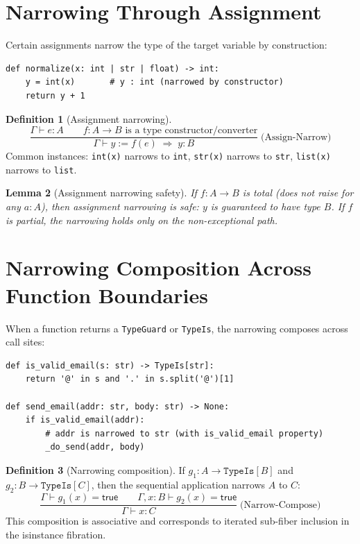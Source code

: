 \documentclass[11pt,a4paper]{report}
\theoremstyle{definition}
\newtheorem{definition}{Definition}[chapter]
\theoremstyle{plain}
\newtheorem{lemma}[definition]{Lemma}
\begin{document}
\section{Narrowing Through Assignment}

Certain assignments narrow the type of the target variable by construction:

\begin{lstlisting}[style=python]
def normalize(x: int | str | float) -> int:
    y = int(x)       # y : int (narrowed by constructor)
    return y + 1
\end{lstlisting}

\begin{definition}[Assignment narrowing]
\[
  \frac{
    \Gamma \vdash e : A \qquad
    f : A \to B \text{ is a type constructor/converter}
  }{
    \Gamma \vdash y \mathbin{:=} f(e) \;\Longrightarrow\; y : B
  }
  \;\text{(Assign-Narrow)}
\]
Common instances: \texttt{int(x)} narrows to \texttt{int},
\texttt{str(x)} narrows to \texttt{str}, \texttt{list(x)} narrows to
\texttt{list}.
\end{definition}

\begin{lemma}[Assignment narrowing safety]
If $f : A \to B$ is total (does not raise for any $a : A$), then
assignment narrowing is safe: $y$ is guaranteed to have type $B$.
If $f$ is partial, the narrowing holds only on the non-exceptional path.
\end{lemma}

\section{Narrowing Composition Across Function Boundaries}

When a function returns a \texttt{TypeGuard} or \texttt{TypeIs}, the
narrowing composes across call sites:

\begin{lstlisting}[style=python]
def is_valid_email(s: str) -> TypeIs[str]:
    return '@' in s and '.' in s.split('@')[1]

def send_email(addr: str, body: str) -> None:
    if is_valid_email(addr):
        # addr is narrowed to str (with is_valid_email property)
        _do_send(addr, body)
\end{lstlisting}

\begin{definition}[Narrowing composition]
If $g_1 : A \to \texttt{TypeIs}[B]$ and $g_2 : B \to \texttt{TypeIs}[C]$,
then the sequential application narrows $A$ to $C$:
\[
  \frac{
    \Gamma \vdash g_1(x) = \mathsf{true} \qquad
    \Gamma, x : B \vdash g_2(x) = \mathsf{true}
  }{
    \Gamma \vdash x : C
  }
  \;\text{(Narrow-Compose)}
\]
This composition is associative and corresponds to iterated sub-fiber
inclusion in the isinstance fibration.
\end{definition}
\end{document}

